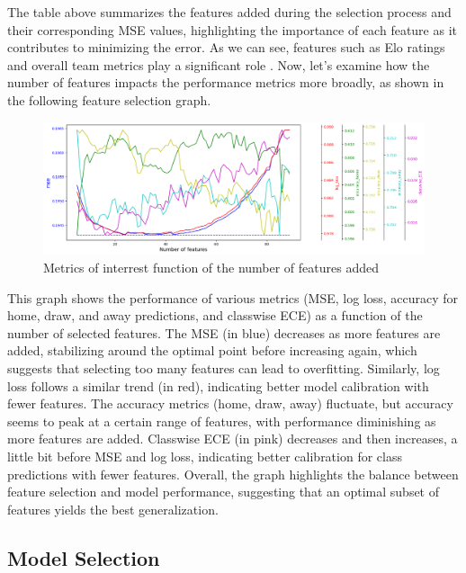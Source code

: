 The table above summarizes the features added during the selection process and their corresponding MSE values, highlighting the importance of each feature as it contributes to minimizing the error. As we can see, features such as Elo ratings and overall team metrics play a significant role \cite{LasekEtAl2013}. Now, let's examine how the number of features impacts the performance metrics more broadly, as shown in the following feature selection graph.

\begin{figure}[H]
    \centering
    \includegraphics[width=\textwidth, keepaspectratio]{images/feature_selection_metrics_by_nb_of_features.png}
    \caption{Metrics of interrest function of the number of features added}
    \label{fig:feature_selection_metrics_by_nb_of_features}
\end{figure}

This graph shows the performance of various metrics (MSE, log loss, accuracy for home, draw, and away predictions, and classwise ECE) as a function of the number of selected features. The MSE (in blue) decreases as more features are added, stabilizing around the optimal point before increasing again, which suggests that selecting too many features can lead to overfitting. Similarly, log loss follows a similar trend (in red), indicating better model calibration with fewer features. The accuracy metrics (home, draw, away) fluctuate, but accuracy seems to peak at a certain range of features, with performance diminishing as more features are added. Classwise ECE (in pink) decreases and then increases, a little bit before MSE and log loss, indicating better calibration for class predictions with fewer features. Overall, the graph highlights the balance between feature selection and model performance, suggesting that an optimal subset of features yields the best generalization.

\subsection{Model Selection}
\label{subsec:model_selection}

